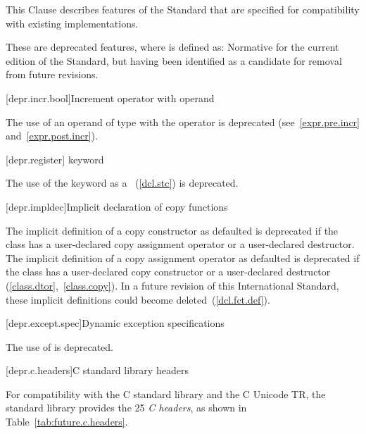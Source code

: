 
\pnum
This Clause describes features of the \Cpp Standard that are specified for compatibility with
existing implementations.

\pnum
These are deprecated features, where
is defined as:
Normative for the current edition of the Standard,
but having been identified as a candidate for removal from future revisions.

[depr.incr.bool]{Increment operator with  operand}

\pnum
The use of an operand of type
with the
\tcode{++}
operator is deprecated (see~\ref{expr.pre.incr} and~\ref{expr.post.incr}).

[depr.register]{ keyword}

\pnum
The use of the  keyword as a
~(\ref{dcl.stc}) is deprecated.

[depr.impldec]{Implicit declaration of copy functions}

\pnum
The implicit definition of a copy constructor
as defaulted
is deprecated if the class has a
user-declared copy assignment operator or a user-declared destructor. The implicit
definition of a copy assignment operator
as defaulted is deprecated if the class has a user-declared
copy constructor or a user-declared destructor (\ref{class.dtor},~\ref{class.copy}).
In a future revision of this International Standard, these implicit definitions
could become deleted~(\ref{dcl.fct.def}).

[depr.except.spec]{Dynamic exception specifications}

\pnum
The use of  is deprecated.

[depr.c.headers]{C standard library headers}

\pnum
For compatibility with the 
%
C standard library
and the C Unicode TR,
the \Cpp standard library provides the 25
\textit{C headers},
as shown in Table~\ref{tab:future.c.headers}.

